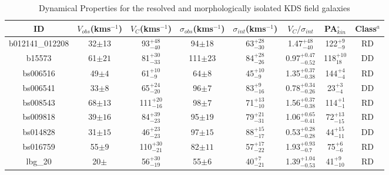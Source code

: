 \documentclass[fleqn,usenatbib]{mn2e}
\begin{document}
\begin{table*}
\centering
\begin{threeparttable}
\caption{Dynamical Properties for the resolved and morphologically isolated KDS field galaxies}
\label{tab:kin_props}
\begin{tabular}{cccccccc}

 \hline
ID & $V_{obs}$(kms$^{-1}$) & $V_{C}$(kms$^{-1}$) & $\sigma_{obs}$(kms$^{-1}$) & $\sigma_{int}$(kms$^{-1}$) & $V_{C}/\sigma_{int}$ & PA$_{kin}^{\circ}$ & Class$^{a}$ \\
 \hline
b012141\_012208 & 32$\pm$13                    & 93$^{+48}_{-40}$                     & 94$\pm$18                 & 63$^{+28}_{-30}$                 & 1.47$^{+48}_{-40}$             & 122$^{+9}_{-9}$ & RD   \\
b15573          & 61$\pm21$                    & 81$^{+30}_{-33}$                     & 111$\pm23$                 & 84$^{+28}_{-26}$          & 0.97$^{+0.47}_{-0.52}$            & 118$^{+10}_{18}$ & DD   \\
bs006516        & 49$\pm4$                    & 61$^{+10}_{-9}$                     & 64$\pm8$                  & 45$^{+10}_{-9}$              & 1.35$^{+0.37}_{-0.38}$         & 144$^{+4}_{-4}$ & RD   \\
bs006541        & 33$\pm8$         & 65$^{+24}_{-20}$          & 96$\pm7$                  & 83$^{+9}_{-16}$             & 0.78$^{+0.34}_{-0.26}$          & 23$^{+3}_{-4}$ & DD    \\
bs008543        & 68$\pm13$                    & 111$^{+20}_{-16}$                    & 98$\pm7$                  & 71$^{+13}_{-10}$         & 1.56$^{+0.37}_{-0.38}$                & 114$^{+1}_{-1}$  & RD  \\
bs009818        & 39$\pm16$                    & 84$^{+39}_{-23}$                     & 95$\pm19$                  & 79$^{+21}_{-31}$       & 1.06$^{+0.65}_{-0.41}$                   & 72$^{+13}_{-15}$ & RD    \\
bs014828        & 31$\pm15$                    & 46$^{+23}_{-23}$                     & 97$\pm15$                  & 88$^{+15}_{-17}$      & 0.53$^{+0.28}_{-0.28}$               & 44$^{+15}_{-11}$  & DD  \\
bs016759        & 55$\pm9$                    & 110$^{+30}_{-21}$                    & 82$\pm11$                  & 57$^{+17}_{-22}$         & 1.93$^{+0.93}_{-0.7}$               & 75$^{+6}_{-6}$ & RD    \\
lbg\_20         & 20$\pm$                    & 56$^{+30}_{-19}$                     & 55$\pm6$                  & 40$^{+7}_{-21}$         & 1.39$^{+1.04}_{-0.53}$              & 41$^{+9}_{-10}$ & RD   \\

\end{tabular}
\end{threeparttable}
\end{table*}
\end{document}
